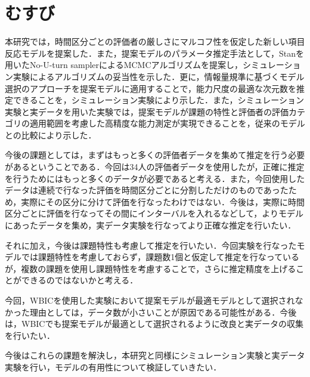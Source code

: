 \documentclass[a4paper,11pt,oneside,openany]{jsbook}
\begin{document}
\newpage
\chapter{むすび}
本研究では，時間区分ごとの評価者の厳しさにマルコフ性を仮定した新しい項目反応モデルを提案した．また，提案モデルのパラメータ推定手法として，Stanを用いたNo-U-turn samplerによるMCMCアルゴリズムを提案し，シミュレーション実験によるアルゴリズムの妥当性を示した．更に，情報量規準に基づくモデル選択のアプローチを提案モデルに適用することで，能力尺度の最適な次元数を推定できることを，シミュレーション実験により示した．また，シミュレーション実験と実データを用いた実験では，提案モデルが課題の特性と評価者の評価カテゴリの適用範囲を考慮した高精度な能力測定が実現できることを，従来のモデルとの比較により示した．

今後の課題としては，まずはもっと多くの評価者データを集めて推定を行う必要があるということである．今回は34人の評価者データを使用したが，正確に推定を行うためにはもっと多くのデータが必要であると考える．また，今回使用したデータは連続で行なった評価を時間区分ごとに分割しただけのものであったため，実際にその区分に分けて評価を行なったわけではない．今後は，実際に時間区分ごとに評価を行なってその間にインターバルを入れるなどして，よりモデルにあったデータを集め，実データ実験を行なってより正確な推定を行いたい．

それに加え，今後は課題特性も考慮して推定を行いたい．今回実験を行なったモデルでは課題特性を考慮しておらず，課題数1個と仮定して推定を行なっているが，複数の課題を使用し課題特性を考慮することで，さらに推定精度を上げることができるのではないかと考える．

今回，WBICを使用した実験において提案モデルが最適モデルとして選択されなかった理由としては，データ数が小さいことが原因である可能性がある．今後は，WBICでも提案モデルが最適として選択されるように改良と実データの収集を行いたい．

今後はこれらの課題を解決し，本研究と同様にシミュレーション実験と実データ実験を行い，モデルの有用性について検証していきたい．



\newpage
\appendix
\end{document}
